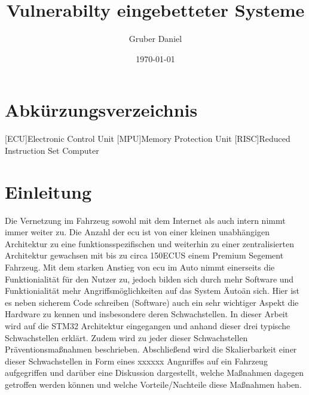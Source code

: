 \documentclass[a4paper,
DIV=13,
12pt,
BCOR=10mm,
department=FakIM,
oneside,
parskip=half,
automark,
listof=totocnumbered,
bibliography=totocnumbered,
acronym=totocnumbered
] {OTHRartcl}
\date{\today}
\title{Vulnerabilty eingebetteter Systeme}
\author{Gruber Daniel}
\begin{document}
\maketitle

\tableofcontents
\newpage

\section*{Abkürzungsverzeichnis}
\label{abkuerzungsverzeichnis}
\begin{acronym}[AUTOSAR]
  [ECU]{Electronic Control Unit}
  [MPU]{Memory Protection Unit}
  [RISC]{Reduced Instruction Set Computer}
\end{acronym}
\newpage

\section{Einleitung}
Die Vernetzung im Fahrzeug sowohl mit dem Internet als auch intern nimmt immer weiter zu. Die Anzahl der \acs{ecu} ist von einer kleinen unabhängigen Architektur
zu eine funktionsspezifischen und weiterhin zu einer zentralisierten Architektur gewachsen mit bis zu circa 150ECUS einem Premium Segement Fahrzeug.
Mit dem starken Anstieg von \acs{ecu} im Auto nimmt einerseits die Funktionialität für den Nutzer zu, jedoch bilden sich durch mehr Software und Funktionialität
mehr Angriffsmöglichkeiten auf das System \"Auto\" an sich. Hier ist es neben sicherem Code schreiben (Software) auch ein sehr wichtiger Aspekt
die Hardware zu kennen und insbesondere deren Schwachstellen.
In dieser Arbeit wird auf die STM32 Architektur eingegangen und anhand dieser drei typische Schwachstellen erklärt. Zudem wird zu jeder dieser
Schwachstellen Präventionsmaßnahmen beschrieben.
Abschließend wird die Skalierbarkeit einer dieser Schwachstellen in Form eines xxxxxx Angnriffes auf ein Fahrzeug aufgegriffen und darüber
eine Diskussion dargestellt, welche Maßnahmen dagegen getroffen werden können und welche Vorteile/Nachteile diese Maßnahmen haben.
\end{document}
